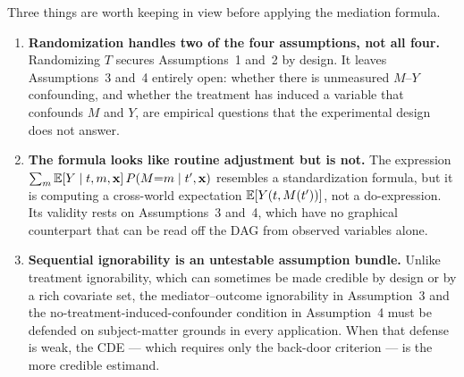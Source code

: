 \documentclass[master.tex]{subfiles}
\begin{document}
\begin{remark}
Three things are worth keeping in view before applying the mediation
formula.
\begin{enumerate}
  \item \textbf{Randomization handles two of the four assumptions, not
    all four.}  Randomizing $T$ secures Assumptions~1 and~2 by
    design.  It leaves Assumptions~3 and~4 entirely open: whether
    there is unmeasured $M$--$Y$ confounding, and whether the
    treatment has induced a variable that confounds $M$ and $Y$, are
    empirical questions that the experimental design does not answer.
  \item \textbf{The formula looks like routine adjustment but is not.}
    The expression $\sum_m \mathbb{E}[Y \mid t, m, \mathbf{x}]\,
    P(M{=}m \mid t', \mathbf{x})$ resembles a standardization formula,
    but it is computing a cross-world expectation $\mathbb{E}[Y(t, M(t'))]$,
    not a do-expression.  Its validity rests on Assumptions~3 and~4,
    which have no graphical counterpart that can be read off the DAG
    from observed variables alone.
  \item \textbf{Sequential ignorability is an untestable assumption
    bundle.}  Unlike treatment ignorability, which can sometimes be
    made credible by design or by a rich covariate set, the
    mediator--outcome ignorability in Assumption~3 and the
    no-treatment-induced-confounder condition in Assumption~4 must be
    defended on subject-matter grounds in every application.  When
    that defense is weak, the CDE --- which requires only the
    back-door criterion --- is the more credible estimand.
\end{enumerate}
\end{remark}
\end{document}
